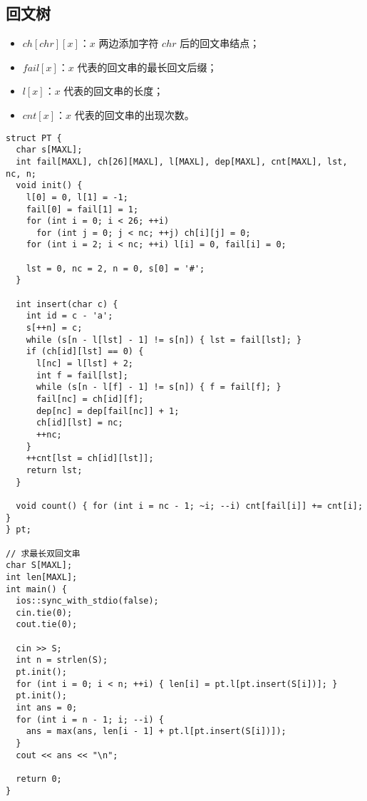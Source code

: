 \subsection{回文树}
\begin{itemize}
\item $ch[chr][x]$：$x$ 两边添加字符 $chr$ 后的回文串结点；
\item $fail[x]$：$x$ 代表的回文串的最长回文后缀；
\item $l[x]$：$x$ 代表的回文串的长度；
\item $cnt[x]$：$x$ 代表的回文串的出现次数。
\end{itemize}
\begin{lstlisting}
struct PT {
  char s[MAXL];
  int fail[MAXL], ch[26][MAXL], l[MAXL], dep[MAXL], cnt[MAXL], lst, nc, n;
  void init() {
    l[0] = 0, l[1] = -1;
    fail[0] = fail[1] = 1;
    for (int i = 0; i < 26; ++i)
      for (int j = 0; j < nc; ++j) ch[i][j] = 0;
    for (int i = 2; i < nc; ++i) l[i] = 0, fail[i] = 0;

    lst = 0, nc = 2, n = 0, s[0] = '#';
  }

  int insert(char c) {
    int id = c - 'a';
    s[++n] = c;
    while (s[n - l[lst] - 1] != s[n]) { lst = fail[lst]; }
    if (ch[id][lst] == 0) {
      l[nc] = l[lst] + 2;
      int f = fail[lst];
      while (s[n - l[f] - 1] != s[n]) { f = fail[f]; }
      fail[nc] = ch[id][f];
      dep[nc] = dep[fail[nc]] + 1;
      ch[id][lst] = nc;
      ++nc;
    }
    ++cnt[lst = ch[id][lst]];
    return lst;
  }

  void count() { for (int i = nc - 1; ~i; --i) cnt[fail[i]] += cnt[i]; }
} pt;

// 求最长双回文串
char S[MAXL];
int len[MAXL];
int main() {
  ios::sync_with_stdio(false);
  cin.tie(0);
  cout.tie(0);

  cin >> S;
  int n = strlen(S);
  pt.init();
  for (int i = 0; i < n; ++i) { len[i] = pt.l[pt.insert(S[i])]; }
  pt.init();
  int ans = 0;
  for (int i = n - 1; i; --i) {
    ans = max(ans, len[i - 1] + pt.l[pt.insert(S[i])]);
  }
  cout << ans << "\n";

  return 0;
}
\end{lstlisting}
